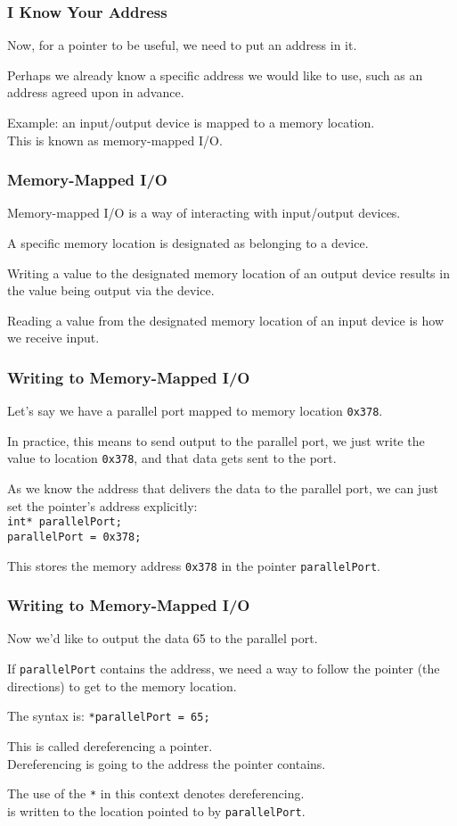 \begin{frame}
\frametitle{I Know Your Address}
Now, for a pointer to be useful, we need to put an address in it.

Perhaps we already know a specific address we would like to use, such as an address agreed upon in advance.

Example: an input/output device is mapped to a memory location.\\
\quad This is known as \alert{memory-mapped I/O}.

\end{frame}

\begin{frame}
\frametitle{Memory-Mapped I/O}
Memory-mapped I/O is a way of interacting with input/output devices.

A specific memory location is designated as belonging to a device. 

Writing a value to the designated memory location of an output device results in the value being output via the device.

Reading a value from the designated memory location of an input device is how we receive input.

\end{frame}


\begin{frame}
\frametitle{Writing to Memory-Mapped I/O}

Let's say we have a parallel port mapped to memory location \texttt{0x378}.

In practice, this means to send output to the parallel port, we just write the value to location \texttt{0x378}, and that data gets sent to the port.

As we know the address that delivers the data to the parallel port, we can just set the pointer's address explicitly:\\
\quad \texttt{int* parallelPort;\\
\quad parallelPort = 0x378;}

This stores the memory address \texttt{0x378} in the pointer \texttt{parallelPort}.

\end{frame}

\begin{frame}
\frametitle{Writing to Memory-Mapped I/O}
Now we'd like to output the data 65 to the parallel port.

If \texttt{parallelPort} contains the address, we need a way to follow the pointer (the directions) to get to the memory location.

The syntax is: \texttt{*parallelPort = 65;}		

This is called \alert{dereferencing} a pointer. \\
\quad Dereferencing is going to the address the pointer contains.

The use of the \texttt{*} in this context denotes dereferencing.\\
 is written to the location pointed to by \texttt{parallelPort}.

\end{frame}


